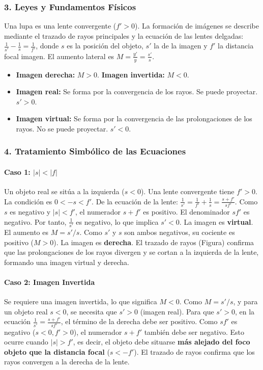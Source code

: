 \subsubsection*{3. Leyes y Fundamentos Físicos}
Una lupa es una lente convergente ($f' > 0$). La formación de imágenes se describe mediante el trazado de rayos principales y la ecuación de las lentes delgadas: $\frac{1}{s'} - \frac{1}{s} = \frac{1}{f'}$, donde $s$ es la posición del objeto, $s'$ la de la imagen y $f'$ la distancia focal imagen. El aumento lateral es $M = \frac{y'}{y} = \frac{s'}{s}$.
\begin{itemize}
    \item \textbf{Imagen derecha:} $M > 0$. \textbf{Imagen invertida:} $M < 0$.
    \item \textbf{Imagen real:} Se forma por la convergencia de los rayos. Se puede proyectar. $s' > 0$.
    \item \textbf{Imagen virtual:} Se forma por la convergencia de las prolongaciones de los rayos. No se puede proyectar. $s' < 0$.
\end{itemize}

\subsubsection*{4. Tratamiento Simbólico de las Ecuaciones}
\paragraph*{Caso 1: $|s| < |f|$}
Un objeto real se sitúa a la izquierda ($s<0$). Una lente convergente tiene $f' > 0$. La condición es $0 < -s < f'$.
De la ecuación de la lente: $\frac{1}{s'} = \frac{1}{f'} + \frac{1}{s} = \frac{s+f'}{s f'}$. Como $s$ es negativo y $|s| < f'$, el numerador $s+f'$ es positivo. El denominador $s f'$ es negativo. Por tanto, $\frac{1}{s'}$ es negativo, lo que implica $s'<0$. La imagen es \textbf{virtual}.
El aumento es $M = s'/s$. Como $s'$ y $s$ son ambos negativos, su cociente es positivo ($M>0$). La imagen es \textbf{derecha}.
El trazado de rayos (Figura) confirma que las prolongaciones de los rayos divergen y se cortan a la izquierda de la lente, formando una imagen virtual y derecha.

\paragraph*{Caso 2: Imagen Invertida}
Se requiere una imagen invertida, lo que significa $M<0$. Como $M = s'/s$, y para un objeto real $s<0$, se necesita que $s'>0$ (imagen real).
Para que $s'>0$, en la ecuación $\frac{1}{s'} = \frac{s+f'}{s f'}$, el término de la derecha debe ser positivo. Como $s f'$ es negativo ($s<0, f'>0$), el numerador $s+f'$ también debe ser negativo. Esto ocurre cuando $|s| > f'$, es decir, el objeto debe situarse \textbf{más alejado del foco objeto que la distancia focal} ($s < -f'$). El trazado de rayos confirma que los rayos convergen a la derecha de la lente.

